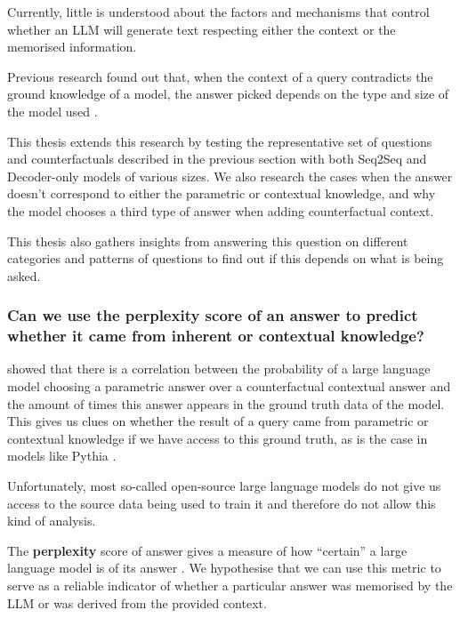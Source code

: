 Currently, little is understood about the factors and mechanisms that control whether an LLM will generate text respecting either the context or the memorised information.

Previous research found out that, when the context of a query contradicts the ground knowledge of a model, the answer picked depends on the type and size of the model used \citep{factual_recall}.

This thesis extends this research by testing the representative set of questions and counterfactuals described in the previous section with both Seq2Seq and Decoder-only models of various sizes.
We also research the cases when the answer doesn't correspond to either the parametric or contextual knowledge, and why the model chooses a third type of answer when adding counterfactual context.

This thesis also gathers insights from answering this question on different categories and patterns of questions to find out if this depends on what is being asked.

\subsubsection{Can we use the perplexity score of an answer to predict whether it came from inherent or contextual knowledge?}

 showed that there is a correlation between the probability of a large language model choosing a parametric answer over a counterfactual contextual answer and the amount of times this answer appears in the ground truth data of the model.
This gives us clues on whether the result of a query came from parametric or contextual knowledge if we have access to this ground truth, as is the case in models like Pythia \citep{pythia}.

Unfortunately, most so-called open-source large language models do not give us access to the source data being used to train it and therefore do not allow this kind of analysis.

The \textbf{perplexity} score of answer gives a measure of how ``certain'' a large language model is of its answer \citep{how_can_we_know}.
We hypothesise that we can use this metric to serve as a reliable indicator of whether a particular answer was memorised by the LLM or was derived from the provided context.

